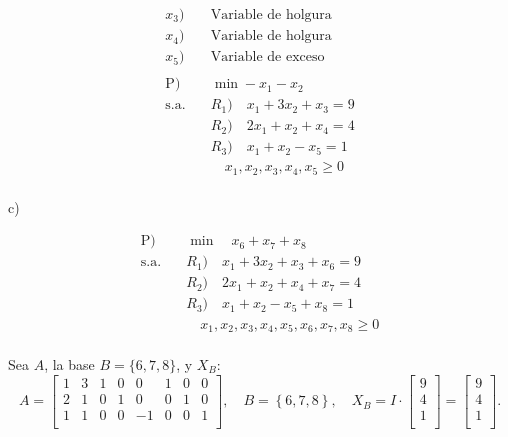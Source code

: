 \documentclass{article}
\begin{document}
\begin{flushleft}
		\begin{center}
			\begin{align*}
				x_3) & \quad \text{Variable de holgura} \\
				x_4) & \quad \text{Variable de holgura} \\
				x_5) & \quad \text{Variable de exceso} \\
				\\
				\text{P}) & \quad \min -x_1 - x_2 \\
				\text{s.a.} & \quad  R_1) \quad x_1 + 3x_2 + x_3 = 9 \\
						   & \quad R_2) \quad 2x_1 + x_2 + x_4 = 4 \\
						   & \quad R_3) \quad x_1 + x_2 - x_5 = 1 \\
						   & \quad \quad x_1, x_2, x_3, x_4, x_5 \geq 0 \\
			\end{align*}
		\end{center}



		\vspace{0,5cm}
		c) \\
		
		\begin{center}
			\begin{align*}
				\text{P}) & \quad \min \quad x_6 + x_7 + x_8 \\
				\text{s.a.} & \quad  R_1) \quad x_1 + 3x_2 + x_3 + x_6 = 9 \\
						   & \quad R_2) \quad 2x_1 + x_2 + x_4 + x_7 = 4 \\
						   & \quad R_3) \quad x_1 + x_2 - x_5 + x_8 = 1 \\
						   & \quad \quad x_1, x_2, x_3, x_4, x_5, x_6, x_7, x_8 \geq 0 \\ 
			\end{align*}
		\end{center}

		Sea \( A \), la base \( B = \{6, 7, 8\} \), y \( X_B \):
		\begin{equation*}
			A =
			\left[
			\begin{array}{cccccccc}
			1 & 3 & 1 & 0 & 0 & 1 & 0  & 0  \\
			2 & 1 & 0 & 1 & 0 & 0 & 1 & 0 \\
			1 & 1 & 0 & 0 & -1 & 0 & 0 & 1  \\
			\end{array}
			\right], \quad
			B =
			\left\{ 6, 7, 8 \right\}, \quad
			X_B = I \cdot
			\left[
			\begin{array}{c}
			9 \\
			4 \\
			1 \\
			\end{array}
			\right] =
			\left[
			\begin{array}{c}
			9 \\
			4 \\
			1 \\
			\end{array}
			\right].
		\end{equation*}


\end{flushleft}
\end{document}
